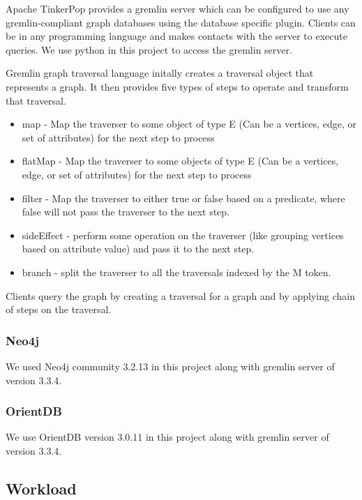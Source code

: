 Apache TinkerPop provides a gremlin server which can be configured to use any gremlin-compliant graph databases using the database specific plugin. Clients can be in any programming language and makes contacts with the server to execute queries. We use python in this project to access the gremlin server.

Gremlin graph traversal language initally creates a traversal object that represents a graph. It then provides five types of steps to operate and transform  that traversal. 

\begin{itemize}
\item map - Map the traverser to some object of type E (Can be a vertices, edge, or set of attributes) for the next step to process
\item flatMap - Map the traverser to some objects of type E (Can be a vertices, edge, or set of attributes) for the next step to process
\item filter - Map the traverser to either true or false based on a predicate, where false will not pass the traverser to the next step.
\item sideEffect - perform some operation on the traverser (like grouping vertices based on attribute value) and pass it to the next step. 
\item branch - split the traverser to all the traversals indexed by the M token.
\end{itemize}

Clients query the graph by creating a traversal for a graph and by applying chain of steps on the traversal.

\subsubsection{Neo4j}

We used Neo4j community 3.2.13 in this project along with gremlin server of version 3.3.4.

\subsubsection{OrientDB}

We use OrientDB version 3.0.11 in this project along with gremlin server of version 3.3.4.

\subsection{Workload}

